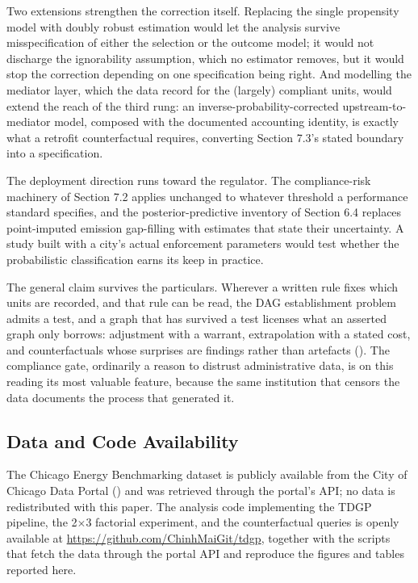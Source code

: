 Two extensions strengthen the correction itself. Replacing the single propensity model with doubly robust estimation would let the analysis survive misspecification of either the selection or the outcome model; it would not discharge the ignorability assumption, which no estimator removes, but it would stop the correction depending on one specification being right. And modelling the mediator layer, which the data record for the (largely) compliant units, would extend the reach of the third rung: an inverse-probability-corrected upstream-to-mediator model, composed with the documented accounting identity, is exactly what a retrofit counterfactual requires, converting Section 7.3's stated boundary into a specification.

The deployment direction runs toward the regulator. The compliance-risk machinery of Section 7.2 applies unchanged to whatever threshold a performance standard specifies, and the posterior-predictive inventory of Section 6.4 replaces point-imputed emission gap-filling with estimates that state their uncertainty. A study built with a city's actual enforcement parameters would test whether the probabilistic classification earns its keep in practice.

The general claim survives the particulars. Wherever a written rule fixes which units are recorded, and that rule can be read, the DAG establishment problem admits a test, and a graph that has survived a test licenses what an asserted graph only borrows: adjustment with a warrant, extrapolation with a stated cost, and counterfactuals whose surprises are findings rather than artefacts (). The compliance gate, ordinarily a reason to distrust administrative data, is on this reading its most valuable feature, because the same institution that censors the data documents the process that generated it.

\subsection{Data and Code Availability}

The Chicago Energy Benchmarking dataset is publicly available from the City of Chicago Data Portal () and was retrieved through the portal's API; no data is redistributed with this paper. The analysis code implementing the TDGP pipeline, the 2$\times$3 factorial experiment, and the counterfactual queries is openly available at \url{https://github.com/ChinhMaiGit/tdgp}, together with the scripts that fetch the data through the portal API and reproduce the figures and tables reported here.

